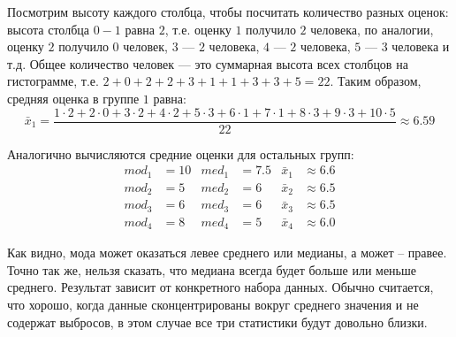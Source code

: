 \documentclass[12pt, a4paper, oneside]{article}
\theoremstyle{plain} %
\theoremstyle{definition}
\begin{document}
\begin{solution}
Посмотрим высоту каждого столбца, чтобы посчитать количество разных оценок: высота столбца $0-1$ равна $2$, т.е. оценку $1$ получило $2$ человека, по аналогии, оценку $2$ получило $0$ человек, $3$ --- $2$ человека, $4$ --- $2$ человека, $5$ --- $3$ человека и т.д.  Общее количество человек --- это суммарная высота всех столбцов на гистограмме, т.е. $2 + 0 + 2 + 2 + 3 + 1 + 1 + 3 + 3 + 5 = 22$.
Таким образом, средняя оценка в группе $1$ равна:
$$
\bar x_1 = \frac{1 \cdot 2 + 2 \cdot 0 + 3 \cdot 2 + 4 \cdot 2 + 5 \cdot 3 + 6 \cdot 1 + 7 \cdot 1 + 8 \cdot 3 + 9 \cdot 3 + 10 \cdot 5}{22} \approx 6.59
$$

Аналогично вычисляются средние оценки для остальных групп:
\begin{align*}
    mod_1 &= 10 &med_1 &= 7.5 &{\bar x_1} &\approx 6.6\\
    mod_2 &= 5 &med_2 &= 6 &{\bar x_2} &\approx 6.5\\
    mod_3 &= 6 &med_3 &= 6 &{\bar x_3} &\approx 6.5\\
    mod_4 &= 8 &med_4 &= 5 &{\bar x_4} &\approx 6.0
\end{align*}

Как видно, мода может оказаться левее среднего или медианы, а может -- правее. Точно так же, нельзя сказать, что медиана всегда будет больше или меньше среднего. Результат зависит от конкретного набора данных. Обычно считается, что хорошо, когда данные сконцентрированы вокруг среднего значения и не содержат выбросов, в этом случае все три статистики будут довольно близки.

\end{solution}


\end{document}
